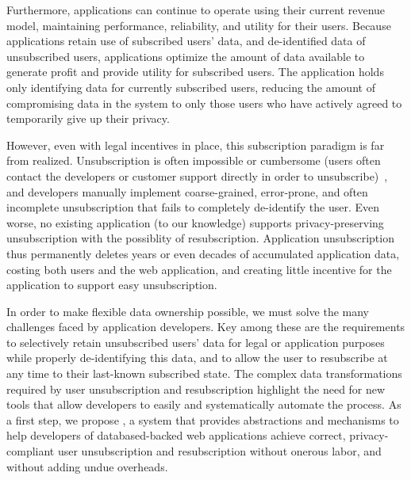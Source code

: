 Furthermore, applications can continue to operate using their current revenue model, maintaining performance,
reliability, and utility for their users. 
Because applications retain use of subscribed users' data, and de-identified data of unsubscribed
users, applications optimize the amount of data available to generate profit and provide utility for
subscribed users. The application holds only identifying data for currently subscribed
users, reducing the amount of compromising data in the system to only those users who have
actively agreed to temporarily give up their privacy.


However, even with legal incentives in place, this subscription paradigm is far from realized.
Unsubscription is often impossible or cumbersome (users often contact the developers or customer
support directly in order to unsubscribe)~\cite{jdm}, and developers manually implement
coarse-grained, error-prone, and often incomplete unsubscription that fails to completely
de-identify the user. Even worse, no existing application (to our knowledge) supports
privacy-preserving unsubscription with the possiblity of resubscription.  Application unsubscription
thus permanently deletes years or even decades of accumulated application data, costing both users
and the web application, and creating little incentive for the application to support easy
unsubscription. 

In order to make flexible data ownership possible, we must solve the many challenges faced by
application developers. Key among these are the requirements to selectively retain unsubscribed
users' data for legal or application purposes while properly de-identifying this data, and to allow
the user to resubscribe at any time to their last-known subscribed state. The complex data
transformations required by user unsubscription and resubscription highlight the need for new tools
that allow developers to easily and systematically automate the process. As a first step, we propose
\sys, a system that provides abstractions and mechanisms to help developers of databased-backed web
applications achieve correct, privacy-compliant user unsubscription and resubscription without
onerous labor, and without adding undue overheads.

